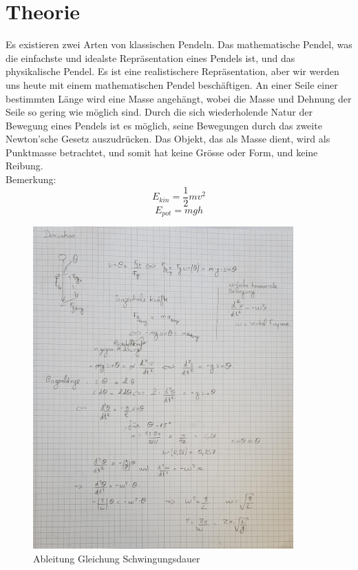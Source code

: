 \documentclass[12pt, a4paper, twoside]{article}
\begin{document}
    \section{Theorie}
    Es existieren zwei Arten von klassischen Pendeln. Das mathematische Pendel, was die einfachste und idealste Repräsentation eines Pendels ist, und das physikalische Pendel. Es ist eine realistischere  Repräsentation, aber wir werden uns heute mit einem mathematischen Pendel beschäftigen. An einer Seile einer bestimmten Länge wird eine Masse angehängt, wobei die Masse und Dehnung der Seile so gering wie möglich sind. 
    Durch die sich wiederholende Natur der Bewegung eines Pendels ist es möglich, seine Bewegungen durch das zweite Newton’sche Gesetz auszudrücken. 
    Das Objekt, das als Masse dient, wird als Punktmasse betrachtet, und somit hat keine Grösse oder Form, und keine Reibung.\\
    Bemerkung:\\
    \[E_{kin}=\frac{1}{2}mv^{2}\] 
    \[E_{pot}=mgh\]
    \begin{figure}[h!]
        \begin{center}
            \includegraphics[scale=0.25, width=10cm]{Theorie.jpeg}
            \caption{Ableitung Gleichung Schwingungsdauer}
        \end{center}
    \end{figure}
    \newpage
\end{document}

